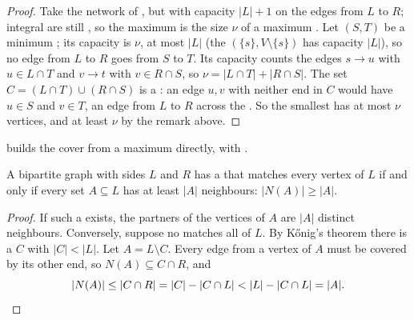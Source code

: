 \begin{proof}
Take the network of , but with capacity $|L| + 1$ on the edges from $L$ to $R$; integral  are still
, so the maximum  is the size $\nu$ of a maximum . Let $(S, T)$ be a minimum ; its capacity is
$\nu$, at most $|L|$ (the  $(\{s\}, V \setminus \{s\})$ has capacity $|L|$), so no edge from $L$ to $R$ goes from $S$
to $T$. Its capacity counts the edges $s \to u$ with $u \in L \cap T$ and $v \to t$ with $v \in R \cap S$, so $\nu = |L \cap T| +
|R \cap S|$. The set $C = (L \cap T) \cup (R \cap S)$ is a : an edge $u, v$ with neither end in $C$ would
have $u \in S$ and $v \in T$, an edge from $L$ to $R$ across the . So the smallest  has at most $\nu$
vertices, and at least $\nu$ by the remark above.
\end{proof}

 builds the cover from a maximum  directly, with .

\begin{theorem}[Hall]\label{thm:b2:flows-and-matchings:hall}
A bipartite graph with sides $L$ and $R$ has a  that matches every vertex of $L$ if and only if every set $A
\subseteq L$ has at least $|A|$ neighbours: $|N(A)| \geq |A|$.
\end{theorem}

\begin{proof}
If such a  exists, the partners of the vertices of $A$ are $|A|$ distinct neighbours. Conversely, suppose no
 matches all of $L$. By K\H{o}nig's theorem there is a  $C$ with $|C| < |L|$. Let $A = L \setminus
C$. Every edge from a vertex of $A$ must be covered by its other end, so $N(A) \subseteq C \cap R$, and
\[
|N(A)| \leq |C \cap R| = |C| - |C \cap L| < |L| - |C \cap L| = |A|. \qedhere
\]
\end{proof}

